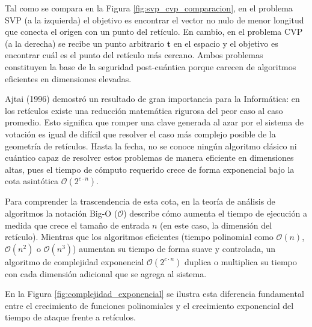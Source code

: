 Tal como se compara en la Figura \ref{fig:svp_cvp_comparacion}, en el problema SVP (a la izquierda) el objetivo es encontrar el vector no nulo de menor longitud que conecta el origen con un punto del retículo. En cambio, en el problema CVP (a la derecha) se recibe un punto arbitrario $\mathbf{t}$ en el espacio y el objetivo es encontrar cuál es el punto del retículo más cercano. Ambos problemas constituyen la base de la seguridad post-cuántica porque carecen de algoritmos eficientes en dimensiones elevadas.

Ajtai (1996) demostró un resultado de gran importancia para la Informática: en los retículos existe una reducción matemática rigurosa del peor caso al caso promedio. Esto significa que romper una clave generada al azar por el sistema de votación es igual de difícil que resolver el caso más complejo posible de la geometría de retículos. Hasta la fecha, no se conoce ningún algoritmo clásico ni cuántico capaz de resolver estos problemas de manera eficiente en dimensiones altas, pues el tiempo de cómputo requerido crece de forma exponencial bajo la cota asintótica $\mathcal{O}(2^{c \cdot n})$.

Para comprender la trascendencia de esta cota, en la teoría de análisis de algoritmos la notación Big-O ($\mathcal{O}$) describe cómo aumenta el tiempo de ejecución a medida que crece el tamaño de entrada $n$ (en este caso, la dimensión del retículo). Mientras que los algoritmos eficientes (tiempo polinomial como $\mathcal{O}(n)$, $\mathcal{O}(n^2)$ o $\mathcal{O}(n^3)$) aumentan su tiempo de forma suave y controlada, un algoritmo de complejidad exponencial $\mathcal{O}(2^{c \cdot n})$ duplica o multiplica su tiempo con cada dimensión adicional que se agrega al sistema.

En la Figura \ref{fig:complejidad_exponencial} se ilustra esta diferencia fundamental entre el crecimiento de funciones polinomiales y el crecimiento exponencial del tiempo de ataque frente a retículos.

